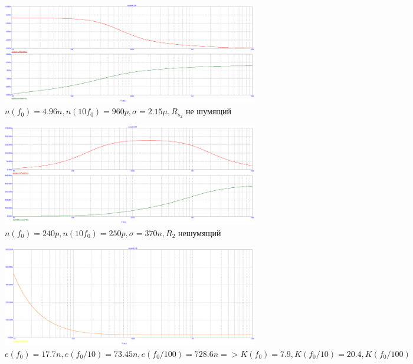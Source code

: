 \documentclass[a4paper, 12pt]{article}%
\begin{document}
\begin{enumerate}
\begin{figure}
    \centering
    \includegraphics[scale=0.3]{images/mod4_2_2_2.png}
    \caption{$n(f_0) = 4.96n, n(10 f_0) = 960p, \sigma = 2.15\mu, R_{s_2}$ не шумящий}
    \label{fig:m4222}
\end{figure}

\begin{figure}
    \centering
    \includegraphics[scale=0.3]{images/mod4_2_2_3.png}
    \caption{$n(f_0) = 240p, n(10 f_0) = 250p, \sigma = 370n,  R_2$ нешумящий}
    \label{fig:m4223}
\end{figure}

\begin{figure}
    \centering
    \includegraphics[scale=0.3]{images/mod4_2_3.png}
    \caption{$e(f_0) = 17.7n, e(f_0/10) = 73.45n, e(f_0/100) = 728.6n => K(f_0) = 7.9, K(f_0/10) = 20.4, K(f_0/100) = 41$}
    \label{fig:m423}
\end{figure}
\FloatBarrier


\end{enumerate}
\end{document}
